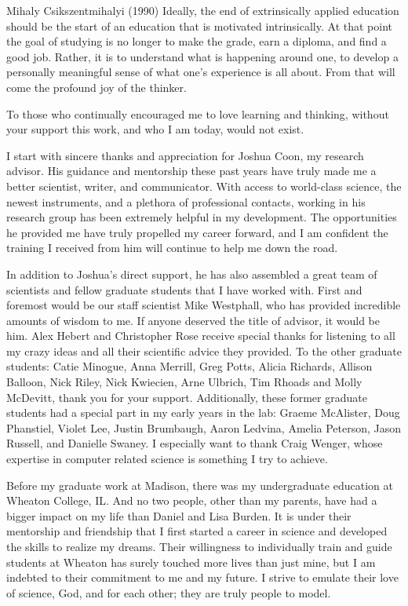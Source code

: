 \begin{wbepi}{Mihaly Csikszentmihalyi (1990)}
Ideally, the end of extrinsically applied education should be the start of an education that is motivated intrinsically. At that point the goal of studying is no longer to make the grade, earn a diploma, and find a good job. Rather, it is to understand what is happening around one, to develop a personally meaningful sense of what one's experience is all about. From that will come the profound joy of the thinker.
\end{wbepi}

To those who continually encouraged me to love learning and thinking, without your support this work, and who I am today, would not exist.

I start with sincere thanks and appreciation for Joshua Coon, my research advisor. His guidance and mentorship these past years have truly made me a better scientist, writer, and communicator. With access to world-class science, the newest instruments, and a plethora of professional contacts, working in his research group has been extremely helpful in my development. The opportunities he provided me have truly propelled my career forward, and I am confident the training I received from him will continue to help me down the road.

In addition to Joshua's direct support, he has also assembled a great team of scientists and fellow graduate students that I have worked with. First and foremost would be our staff scientist Mike Westphall, who has provided incredible amounts of wisdom to me. If anyone deserved the title of advisor, it would be him. Alex Hebert and Christopher Rose receive special thanks for listening to all my crazy ideas and all their scientific advice they provided. To the other graduate students: Catie Minogue, Anna Merrill, Greg Potts, Alicia Richards, Allison Balloon, Nick Riley, Nick Kwiecien, Arne Ulbrich, Tim Rhoads and Molly McDevitt, thank you for your support. Additionally, these former graduate students had a special part in my early years in the lab: Graeme McAlister, Doug Phanstiel, Violet Lee, Justin Brumbaugh, Aaron Ledvina, Amelia Peterson, Jason Russell, and Danielle Swaney. I especially want to thank Craig Wenger, whose expertise in computer related science is something I try to achieve.

Before my graduate work at Madison, there was my undergraduate education at Wheaton College, IL. And no two people, other than my parents, have had a bigger impact on my life than Daniel and Lisa Burden. It is under their mentorship and friendship that I first started a career in science and developed the skills to realize my dreams. Their willingness to individually train and guide students at Wheaton has surely touched more lives than just mine, but I am indebted to their commitment to me and my future. I strive to emulate their love of science, God, and for each other; they are truly people to model.

